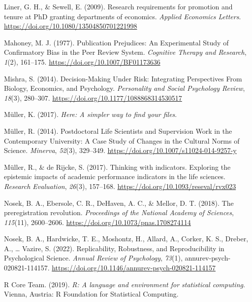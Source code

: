 \documentclass[
  ,man,mask,floatsintext]{apa6}
\newlength{\cslhangindent}
\newlength{\cslentryspacingunit} %
\newenvironment{CSLReferences}[2] %
 {%
  \setlength{\parindent}{0pt}
  \ifodd #1
  \let\oldpar\par
  \def\par{\hangindent=\cslhangindent\oldpar}
  \fi
  \setlength{\parskip}{#2\cslentryspacingunit}
 }%
 {}
\begin{document}
\begin{CSLReferences}{1}{0}
\leavevmode{}%
Liner, G. H., \& Sewell, E. (2009). Research requirements for promotion and tenure at {PhD} granting departments of economics. \emph{Applied Economics Letters}. \url{https://doi.org/10.1080/13504850701221998}

\leavevmode{}%
Mahoney, M. J. (1977). Publication {Prejudices}: {An Experimental Study} of {Confirmatory Bias} in the {Peer Review System}. \emph{Cognitive Therapy and Research}, \emph{1}(2), 161--175. \url{https://doi.org/10.1007/BF01173636}

\leavevmode{}%
Mishra, S. (2014). Decision-{Making Under Risk}: {Integrating Perspectives From Biology}, {Economics}, and {Psychology}. \emph{Personality and Social Psychology Review}, \emph{18}(3), 280--307. \url{https://doi.org/10.1177/1088868314530517}

\leavevmode{}%
Müller, K. (2017). \emph{Here: {A} simpler way to find your files}.

\leavevmode{}%
Müller, R. (2014). Postdoctoral {Life Scientists} and {Supervision Work} in the {Contemporary University}: {A Case Study} of {Changes} in the {Cultural Norms} of {Science}. \emph{Minerva}, \emph{52}(3), 329--349. \url{https://doi.org/10.1007/s11024-014-9257-y}

\leavevmode{}%
Müller, R., \& de Rijcke, S. (2017). Thinking with indicators. {Exploring} the epistemic impacts of academic performance indicators in the life sciences. \emph{Research Evaluation}, \emph{26}(3), 157--168. \url{https://doi.org/10.1093/reseval/rvx023}

\leavevmode{}%
Nosek, B. A., Ebersole, C. R., DeHaven, A. C., \& Mellor, D. T. (2018). The preregistration revolution. \emph{Proceedings of the National Academy of Sciences}, \emph{115}(11), 2600--2606. \url{https://doi.org/10.1073/pnas.1708274114}

\leavevmode{}%
Nosek, B. A., Hardwicke, T. E., Moshontz, H., Allard, A., Corker, K. S., Dreber, A., \ldots{} Vazire, S. (2022). Replicability, {Robustness}, and {Reproducibility} in {Psychological Science}. \emph{Annual Review of Psychology}, \emph{73}(1), annurev-psych-020821-114157. \url{https://doi.org/10.1146/annurev-psych-020821-114157}

\leavevmode{}%
R Core Team. (2019). \emph{R: {A} language and environment for statistical computing}. Vienna, Austria: R Foundation for Statistical Computing.


\end{CSLReferences}
\end{document}
